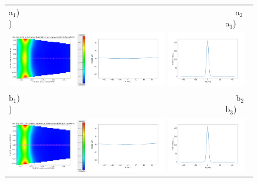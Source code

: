 \documentclass[aps,pra,showpacs,twocolumn,amsmath,amssymb,superscriptaddress,nofootinbib]{revtex4}
\begin{document}
  

\thispagestyle{empty}

 \begin{figure}
  \label{fig:M1deformation} 
  \begin{center}
   \begin{tabular}{l} 
   a$_1$)~~~~~~~~~~~~~~~~~~~~~~~~~~~~~~~~~~~~~~~~~~~~~~~~~~~~
   a$_2$)~~~~~~~~~~~~~~~~~~~~~~~~~~~~~~~~~~~~~~~~~~~~~~~~~~~~a$_3$)\\
   \includegraphics[width=0.32\textwidth]{figures/cryogenic2d.png} 
   \includegraphics[width=0.32\textwidth]{figures/deformation1.png}
   \includegraphics[width=0.32\textwidth]{figures/intensity1.png} \\

  b$_1$)~~~~~~~~~~~~~~~~~~~~~~~~~~~~~~~~~~~~~~~~~~~~~~~~~~~~
  b$_2$)~~~~~~~~~~~~~~~~~~~~~~~~~~~~~~~~~~~~~~~~~~~~~~~~~~~~b$_3$)\\
  \includegraphics[width=0.32\textwidth]{figures/cryogenic2dKh.png}
  \includegraphics[width=0.32\textwidth]{figures/deformation2.png}
  \includegraphics[width=0.32\textwidth]{figures/intensity2.png} \\
   

\end{tabular}
\end{center}
\end{figure}
\end{document}
